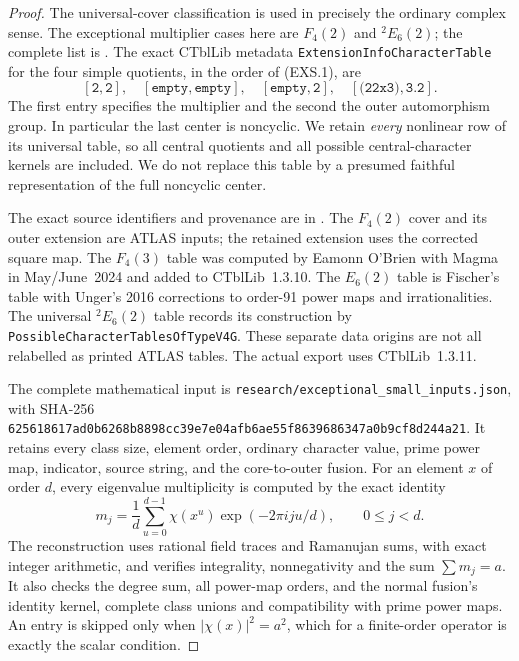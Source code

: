 \begin{proof}
The universal-cover classification is used in precisely the ordinary
complex sense. The exceptional multiplier cases here are $F_4(2)$ and
${}^2E_6(2)$; the complete list is
\cite[Chapter~5, Table~1, p.~35]{BI:HHM}. The exact CTblLib metadata
\texttt{ExtensionInfoCharacterTable} for the four simple quotients,
in the order of (EXS.1), are
\[
 [\texttt{2},\texttt{2}],\quad
 [\texttt{empty},\texttt{empty}],\quad
 [\texttt{empty},\texttt{2}],\quad
 [\texttt{(2\^{}2x3)},\texttt{3.2}].                         \tag{EXS.2}
\]
The first entry specifies the multiplier and the second the outer
automorphism group. In particular the last center is noncyclic.
We retain \emph{every} nonlinear row of its universal table, so all
central quotients and all possible central-character kernels are included.
We do not replace this table by a presumed faithful representation
of the full noncyclic center.

The exact source identifiers and provenance are in
\cite{HD:ExceptionalSmallTables}. The $F_4(2)$ cover and its outer
extension are ATLAS inputs; the retained extension uses the corrected
square map. The $F_4(3)$ table was computed by Eamonn O'Brien with
Magma in May/June~2024 and added to CTblLib~1.3.10. The $E_6(2)$
table is Fischer's table with Unger's 2016 corrections to order-91
power maps and irrationalities. The universal ${}^2E_6(2)$ table
records its construction by \texttt{PossibleCharacterTablesOfTypeV4G}.
These separate data origins are not all relabelled as printed ATLAS
tables. The actual export uses CTblLib~1.3.11.

The complete mathematical input is
\texttt{research/exceptional\_small\_inputs.json}, with SHA-256
\texttt{625618617ad0b6268b8898cc39e7e04afb6ae55f8639686347a0b9cf8d244a21}.
It retains every class size, element order, ordinary character value,
prime power map, indicator, source string, and the core-to-outer fusion.
For an element $x$ of order $d$, every eigenvalue multiplicity is
computed by the exact identity
\[
 m_j=\frac1d\sum_{u=0}^{d-1}\chi(x^u)\exp(-2\pi iju/d),
                       \qquad 0\le j<d.                        \tag{EXS.3}
\]
The reconstruction uses rational field traces and Ramanujan sums,
with exact integer arithmetic, and verifies integrality,
nonnegativity and the sum $\sum m_j=a$. It also checks the degree
sum, all power-map orders, and the normal fusion's identity kernel,
complete class unions and compatibility with prime power maps.
An entry is skipped only when $|\chi(x)|^2=a^2$, which for a
finite-order operator is exactly the scalar condition.


\end{proof}
